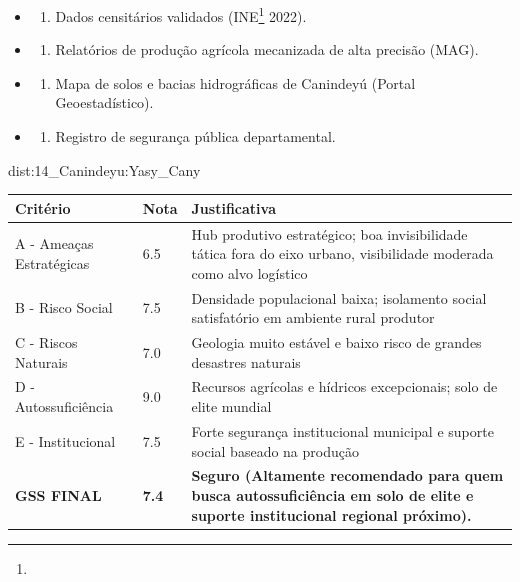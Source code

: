 {\begin{itemize}
\tightlist
\item
  \begin{enumerate}
  \def\labelenumi{\arabic{enumi})}
  \tightlist
  \item
    Dados censitários validados (INE\footnote{\fineINE} 2022).
  \end{enumerate}
\item
  \begin{enumerate}
  \def\labelenumi{\arabic{enumi})}
  \setcounter{enumi}{1}
  \tightlist
  \item
    Relatórios de produção agrícola mecanizada de alta precisão (MAG).
  \end{enumerate}
\item
  \begin{enumerate}
  \def\labelenumi{\arabic{enumi})}
  \setcounter{enumi}{2}
  \tightlist
  \item
    Mapa de solos e bacias hidrográficas de Canindeyú (Portal
    Geoestadístico).
  \end{enumerate}
\item
  \begin{enumerate}
  \def\labelenumi{\arabic{enumi})}
  \setcounter{enumi}{3}
  \tightlist
  \item
    Registro de segurança pública departamental.
  \end{enumerate}
\end{itemize}}{dist:14_Canindeyu:Yasy_Cany}
\begin{table}[ht!]
\small \begin{tabular}{p{3.0cm}p{0.8cm}p{6.0cm}} \toprule
\textbf{Critério} & \textbf{Nota} & \textbf{Justificativa} \\ \midrule
A - Ameaças Estratégicas & 6.5 & Hub produtivo estratégico; boa invisibilidade tática fora do eixo urbano, visibilidade moderada como alvo logístico \\
B - Risco Social & 7.5 & Densidade populacional baixa; isolamento social satisfatório em ambiente rural produtor \\
C - Riscos Naturais & 7.0 & Geologia muito estável e baixo risco de grandes desastres naturais \\
D - Autossuficiência & 9.0 & Recursos agrícolas e hídricos excepcionais; solo de elite mundial \\
E - Institucional & 7.5 & Forte segurança institucional municipal e suporte social baseado na produção \\
\midrule \textbf{GSS FINAL} & \textbf{7.4} & \textbf{Seguro (Altamente recomendado para quem busca autossuficiência em solo de elite e suporte institucional regional próximo).} \\ \bottomrule \end{tabular}
\end{table}
